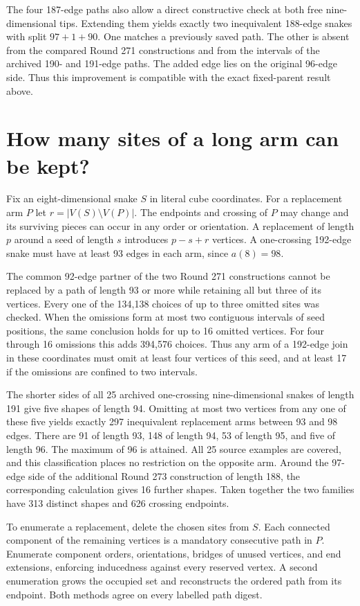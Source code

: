 \documentclass[11pt,a4paper]{article}
\theoremstyle{definition}
\theoremstyle{remark}
\begin{document}
The four 187-edge paths also allow a direct constructive check at both free nine-dimensional tips. Extending them yields exactly two inequivalent 188-edge snakes with split \(97+1+90\). One matches a previously saved path. The other is absent from the compared Round 271 constructions and from the intervals of the archived 190- and 191-edge paths. The added edge lies on the original 96-edge side. Thus this improvement is compatible with the exact fixed-parent result above.

\section{How many sites of a long arm can be kept?}
Fix an eight-dimensional snake \(S\) in literal cube coordinates. For a replacement arm \(P\) let \(r=|V(S)\setminus V(P)|\). The endpoints and crossing of \(P\) may change and its surviving pieces can occur in any order or orientation. A replacement of length \(p\) around a seed of length \(s\) introduces \(p-s+r\) vertices. A one-crossing 192-edge snake must have at least 93 edges in each arm, since \(a(8)=98\).

The common 92-edge partner of the two Round 271 constructions cannot be replaced by a path of length 93 or more while retaining all but three of its vertices. Every one of the 134,138 choices of up to three omitted sites was checked. When the omissions form at most two contiguous intervals of seed positions, the same conclusion holds for up to 16 omitted vertices. For four through 16 omissions this adds 394,576 choices. Thus any arm of a 192-edge join in these coordinates must omit at least four vertices of this seed, and at least 17 if the omissions are confined to two intervals.

The shorter sides of all 25 archived one-crossing nine-dimensional snakes of length 191 give five shapes of length 94. Omitting at most two vertices from any one of these five yields exactly 297 inequivalent replacement arms between 93 and 98 edges. There are 91 of length 93, 148 of length 94, 53 of length 95, and five of length 96. The maximum of 96 is attained. All 25 source examples are covered, and this classification places no restriction on the opposite arm. Around the 97-edge side of the additional Round 273 construction of length 188, the corresponding calculation gives 16 further shapes. Taken together the two families have 313 distinct shapes and 626 crossing endpoints.

To enumerate a replacement, delete the chosen sites from \(S\). Each connected component of the remaining vertices is a mandatory consecutive path in \(P\). Enumerate component orders, orientations, bridges of unused vertices, and end extensions, enforcing inducedness against every reserved vertex. A second enumeration grows the occupied set and reconstructs the ordered path from its endpoint. Both methods agree on every labelled path digest.
\end{document}
